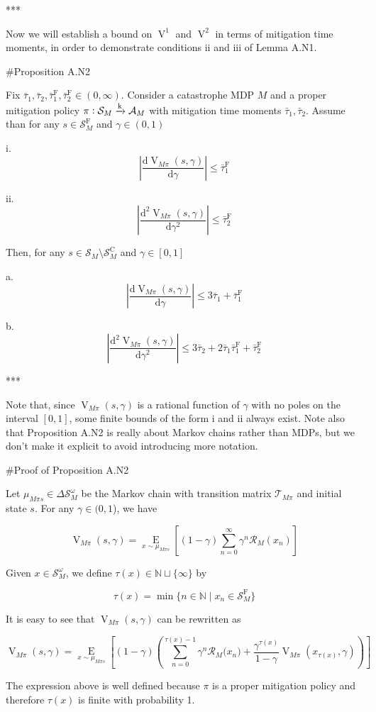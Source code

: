 \documentclass[a4paper]{article}
\newcommand{\AP}[1]{\left(#1\right)}
\newcommand{\AB}[1]{\left[#1\right]}
\newcommand{\Ea}[2]{\underset{#1}{\operatorname{E}}\AB{#2}}
\newcommand{\D}{\mathrm{d}}
\newcommand{\Nats}{\mathbb{N}}
\newcommand{\Abs}[1]{\left\vert #1 \right\vert}
\newcommand{\M}{\xrightarrow{\textnormal{k}}}
\newcommand{\A}{\mathcal{A}}
\newcommand{\St}{\mathcal{S}}
\newcommand{\T}{\mathcal{T}}
\newcommand{\R}{\mathcal{R}}
\newcommand{\RMC}{\mathrm{C}}
\newcommand{\RMF}{\mathrm{F}}
\newcommand{\SF}{\St^{\RMF}}
\newcommand{\SC}{\St^{\RMC}}
\newcommand{\TF}{\bar{\tau}^{\RMF}}
\newcommand{\V}{\operatorname{V}}
\begin{document}
***

Now we will establish a bound on $\V^1$ and $\V^2$ in terms of mitigation time moments, in order to demonstrate conditions ii and iii of Lemma A.N1.

\#Proposition A.N2

Fix $\bar{\tau}_1, \bar{\tau}_2, \TF_1, \TF_2 \in (0,\infty)$. Consider a catastrophe MDP $M$ and a proper mitigation policy $\pi: \St_M \M \A_M$ with mitigation time moments $\bar{\tau}_1, \bar{\tau}_2$. Assume than for any $s \in \SF_M$ and $\gamma\in(0,1)$

i. $$\Abs{\frac{\D\V_{M\pi}(s,\gamma)}{\D\gamma}} \leq \TF_1$$

ii. $$\Abs{\frac{\D^2\V_{M\pi}(s,\gamma)}{\D\gamma^2}} \leq \TF_2$$

Then, for any $s \in \St_M \setminus \SC_M$ and $\gamma\in[0,1]$

a. $$\Abs{\frac{\D\V_{M\pi}(s,\gamma)}{\D\gamma}} \leq 3 \bar{\tau}_1 + \TF_1$$

b. $$\Abs{\frac{\D^2\V_{M\pi}(s,\gamma)}{\D\gamma^2}} \leq 3 \bar{\tau}_2 + 2 \bar{\tau}_1 \TF_1 + \TF_2$$

***

Note that, since $\V_{M\pi}(s,\gamma)$ is a rational function of $\gamma$ with no poles on the interval $[0,1]$, some finite bounds of the form i and ii always exist. Note also that Proposition A.N2 is really about Markov chains rather than MDPs, but we don't make it explicit to avoid introducing more notation.

\#Proof of Proposition A.N2

Let $\mu_{M\pi s}\in\Delta\St_M^\omega$ be the Markov chain with transition matrix $\T_{M\pi}$ and initial state $s$. For any $\gamma\in(0,1$), we have

$$\V_{M\pi}(s,\gamma) = \Ea{x\sim\mu_{M\pi s}}{(1-\gamma)\sum_{n=0}^\infty \gamma^n \R_M\AP{x_n}}$$

Given $x\in\St_M^\omega$, we define $\tau(x) \in \Nats \sqcup \{\infty\}$ by 

$$\tau(x)=\min\{n \in \Nats \mid x_n \in \SF_M\}$$

It is easy to see that $\V_{M\pi}(s,\gamma)$ can be rewritten as

$$\V_{M\pi}(s,\gamma) = \Ea{x\sim\mu_{M\pi s}}{(1-\gamma)\AP{\sum_{n=0}^{\tau(x)-1} \gamma^n \R_M\Big(x_n\Big) + \frac{\gamma^{\tau(x)}}{1-\gamma}\V_{M\pi}\AP{x_{\tau(x)},\gamma}}}$$

The expression above is well defined because $\pi$ is a proper mitigation policy and therefore $\tau(x)$ is finite with probability 1.
\end{document}
